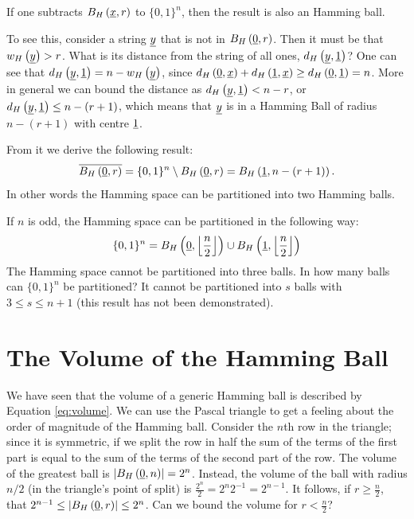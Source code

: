 If one subtracts $B_H\left(\underline{x}, r\right)$ to $\{0, 1\}^n$, then the result is also an Hamming ball.

To see this, consider a string $\underline{y}$ that is not in $B_H\left(\underline{0}, r\right)$.
Then it must be that $w_H\left(\underline{y}\right) > r$.
What is its distance from the string of all ones, \ie $d_H \left({\underline{y},\underline{1}}\right)$?
One can see that $d_H \left({\underline{y},\underline{1}}\right) = n - w_H\left(\underline{y}\right)$, since $d_H \left({\underline{0},\underline{x}}\right) + d_H \left({\underline{1},\underline{x}}\right) \ge d_H \left({\underline{0},\underline{1}}\right) = n$.
More in general we can bound the distance as $d_H \left({\underline{y},\underline{1}}\right) < n - r$, or $d_H \left({\underline{y},\underline{1}}\right) \le n - (r+1)$, which means that $\underline{y}$ is in a Hamming Ball of radius $n - (r+1)$ with centre $\underline{1}$.

From it we derive the following result:
\begin{equation*}
	\overline{B_H\left(\underline{0}, r\right)} = \{0,1\}^{n} \setminus B_H\left(\underline{0}, r\right) = B_H\left(\underline{1}, n - (r+1)\right).
\end{equation*}
In other words the Hamming space can be partitioned into two Hamming balls.

If $n$ is odd, the Hamming space can be partitioned in the following way:
\begin{equation*}
	\{0, 1\}^n = B_H\left(\underline{0}, \left\lfloor{\frac{n}{2}}\right\rfloor\right) \cup B_H\left(\underline{1}, \left\lfloor{\frac{n}{2}}\right\rfloor\right)
\end{equation*}
The Hamming space cannot be partitioned into three balls.
In how many balls can $\{0, 1\}^n$ be partitioned?
It cannot be partitioned into $s$ balls with $3 \leq s \leq n + 1$ (this result has not been demonstrated).

\section{The Volume of the Hamming Ball}

We have seen that the volume of a generic Hamming ball is described by Equation \ref{eq:volume}.
We can use the Pascal triangle to get a feeling about the order of magnitude of the Hamming ball.
Consider the $n$th row in the triangle; since it is symmetric, if we split the row in half the sum of the terms of the first part is equal to the sum of the terms of the second part of the row.
The volume of the greatest ball is $\left|{B_H\left(\underline{0}, n\right)}\right| = 2^n$.
Instead, the volume of the ball with radius $n/2$ (in the triangle's point of split) is $\frac{2^n}{2} = 2^n2^{-1} = 2^{n-1}$.
It follows, if $r \ge \frac{n}{2}$, that $2^{n-1} \le \left|{B_H\left(\underline{0}, r\right)}\right| \le 2^n$.
Can we bound the volume for $r < \frac{n}{2}$?

